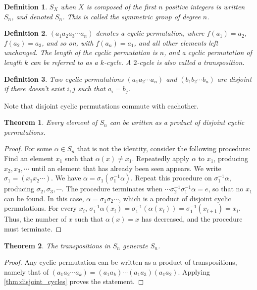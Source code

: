 \documentclass{article}
\newtheorem{theorem}{Theorem}[section]
\newtheorem{definition}{Definition}[section]
\begin{document}
\begin{definition}
    $S_X$ when $X$ is composed of the first $n$ positive integers is written $S_n$, and denoted $S_n$.
    This is called the \emph{symmetric group} of degree $n$.
\end{definition}
\begin{definition}
    $(a_{1}a_{2}a_{3} \cdots a_n)$ denotes a \emph{cyclic} permutation, where
    $f(a_{1}) = a_{2}$, $f(a_{2}) = a_{3}$, and so on, 
    with $f(a_n) = a_{1}$, and all other elements left unchanged.
    The length of the cyclic permutation is $n$, 
    and a cyclic permutation of length $k$ can be referred to as a $k$-cycle.
    A $2$-cycle is also called a \emph{transposition}.
\end{definition}
\begin{definition}
    Two cyclic permutations $(a_{1}a_{2} \cdots a_n)$ and $(b_{1}b_{2} \cdots b_n)$
    are \emph{disjoint} if there doesn't exist $i,j$ such that $a_i = b_j$.
\end{definition}

Note that disjoint cyclic permutations commute with eachother.

\begin{theorem}
    \label{thm:disjoint_cycles}
    Every element of $S_n$ can be written as a product of disjoint cyclic permutations.
\end{theorem}
\begin{proof}
    For some $\alpha \in S_n$ that is not the identity, consider the following procedure:
    Find an element $x_{1}$ such that $\alpha(x) \ne x_{1}$.
    Repeatedly apply $\alpha$ to $x_{1}$, producing $x_{2},x_{3},\cdots$ until an element that has already been seen appears.
    We write $\sigma_{1} = (x_{1}x_{2}\cdots)$.
    We have $\alpha = \sigma_{1}(\sigma_{1}^{-1}\alpha)$.
    Repeat this procedure on $\sigma_{1}^{-1}\alpha$, producing $\sigma_{2},\sigma_{3},\cdots$.
    The procedure terminates when $\cdots\sigma_{2}^{-1}\sigma_{1}^{-1}\alpha = e$, so that no $x_{1}$ can be found.
    In this case, $\alpha = \sigma_{1}\sigma_{2}\cdots$, which is a product of disjoint cyclic permutations.
    For every $x_i$, $\sigma_{1}^{-1}\alpha(x_i) = \sigma_{1}^{-1}(\alpha(x_i)) = \sigma_{1}^{-1}(x_{i+1}) = x_i$.
    Thus, the number of $x$ such that $\alpha(x) = x$ has decreased, and the procedure must terminate.
\end{proof}

\begin{theorem}
    The transpositions in $S_n$ generate $S_n$.
\end{theorem}
\begin{proof}
    Any cyclic permutation can be written as a product of transpositions, 
    namely that of $(a_{1}a_{2} \cdots a_k) = (a_{1}a_{k})\cdots(a_{1}a_{3})(a_{1}a_{2})$.
    Applying \autoref{thm:disjoint_cycles} proves the statement.
\end{proof}
\end{document}
